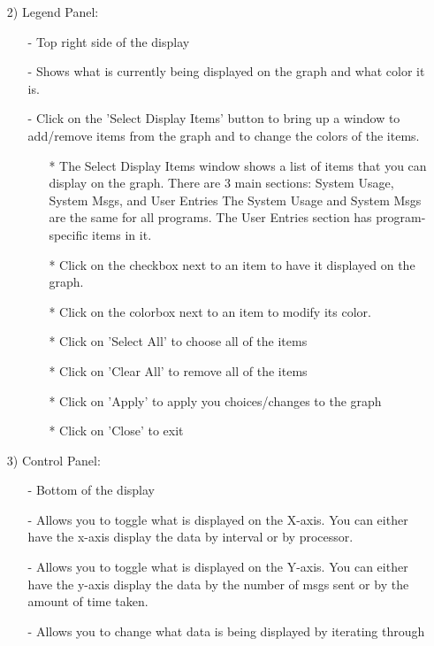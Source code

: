 \begin{enumerate}
\begin{enumerate}
   \item[2)]
   Legend Panel:
      \begin{itemize}
      \item[-]
        Top right side of the display
      \item[-]
        Shows what is currently being displayed on the graph and what color it
        is.
      \item[-]
        Click on the 'Select Display Items' button to bring up a window to
        add/remove items from the graph and to change the colors of the items.
        \begin{itemize}
	\item[*]
          The Select Display Items window shows a list of items that you can
          display on the graph.  There are 3 main sections:
            System Usage, System Msgs, and User Entries
          The System Usage and System Msgs are the same for all programs.  The
          User Entries section has program-specific items in it.
	\item[*]
          Click on the checkbox next to an item to have it displayed on the
          graph.
	\item[*]
          Click on the colorbox next to an item to modify its color.
	\item[*]
          Click on 'Select All' to choose all of the items
	\item[*]
          Click on 'Clear All' to remove all of the items
	\item[*]
          Click on 'Apply' to apply you choices/changes to the graph
	\item[*]
          Click on 'Close' to exit
	\end{itemize}
      \end{itemize}
   \item[3)]
   Control Panel:
      \begin{itemize}
      \item[-]
        Bottom of the display
      \item[-]
        Allows you to toggle what is displayed on the X-axis.  You can either
        have the x-axis display the data by interval or by processor.
      \item[-]
        Allows you to toggle what is displayed on the Y-axis.  You can either
        have the y-axis display the data by the number of msgs sent or
        by the amount of time taken.
      \item[-]
        Allows you to change what data is being displayed by iterating through

\end{itemize}
\end{enumerate}
\end{enumerate}
